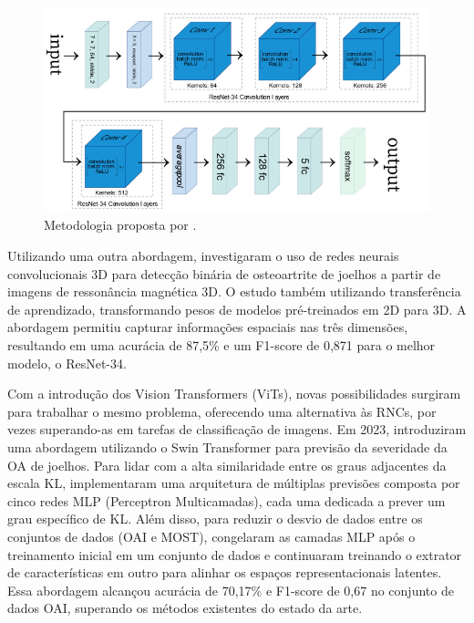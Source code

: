\begin{figure}[ht]
    \centering
    \includegraphics[width=\textwidth]{figs/cueva2022.png}
    \caption{Metodologia proposta por .}
    \label{fig:cueva2022}
\end{figure}

Utilizando uma outra abordagem,  investigaram o uso de redes neurais convolucionais 3D para detecção binária de osteoartrite de joelhos a partir de imagens de ressonância magnética 3D. O estudo também utilizando transferência de aprendizado, transformando pesos de modelos pré-treinados em 2D para 3D. A abordagem permitiu capturar informações espaciais nas três dimensões, resultando em uma acurácia de 87,5\% e um F1-score de 0,871 para o melhor modelo, o ResNet-34.

Com a introdução dos Vision Transformers (ViTs), novas possibilidades surgiram para trabalhar o mesmo problema, oferecendo uma alternativa às RNCs, por vezes superando-as em tarefas de classificação de imagens. Em 2023,  introduziram uma abordagem utilizando o Swin Transformer para previsão da severidade da OA de joelhos. Para lidar com a alta similaridade entre os graus adjacentes da escala KL, implementaram uma arquitetura de múltiplas previsões composta por cinco redes MLP (Perceptron Multicamadas), cada uma dedicada a prever um grau específico de KL. Além disso, para reduzir o desvio de dados entre os conjuntos de dados (OAI e MOST), congelaram as camadas MLP após o treinamento inicial em um conjunto de dados e continuaram treinando o extrator de características em outro para alinhar os espaços representacionais latentes. Essa abordagem alcançou acurácia de 70,17\% e F1-score de 0,67 no conjunto de dados OAI, superando os métodos existentes do estado da arte.


